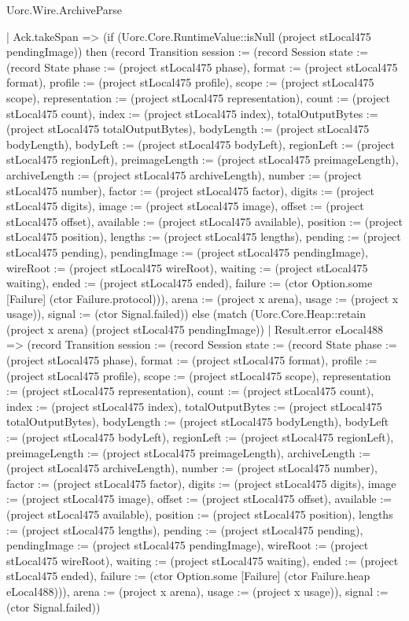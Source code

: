 \begin{lexlean}{Uorc.Wire.ArchiveParse}
\begin{semanticmodule}
{          | Ack.takeSpan => (if (Uorc.Core.RuntimeValue::isNull (project stLocal475 pendingImage)) then (record Transition {session := (record Session {state := (record State {phase := (project stLocal475 phase), format := (project stLocal475 format), profile := (project stLocal475 profile), scope := (project stLocal475 scope), representation := (project stLocal475 representation), count := (project stLocal475 count), index := (project stLocal475 index), totalOutputBytes := (project stLocal475 totalOutputBytes), bodyLength := (project stLocal475 bodyLength), bodyLeft := (project stLocal475 bodyLeft), regionLeft := (project stLocal475 regionLeft), preimageLength := (project stLocal475 preimageLength), archiveLength := (project stLocal475 archiveLength), number := (project stLocal475 number), factor := (project stLocal475 factor), digits := (project stLocal475 digits), image := (project stLocal475 image), offset := (project stLocal475 offset), available := (project stLocal475 available), position := (project stLocal475 position), lengths := (project stLocal475 lengths), pending := (project stLocal475 pending), pendingImage := (project stLocal475 pendingImage), wireRoot := (project stLocal475 wireRoot), waiting := (project stLocal475 waiting), ended := (project stLocal475 ended), failure := (ctor Option.some [Failure] (ctor Failure.protocol))}), arena := (project x arena), usage := (project x usage)}), signal := (ctor Signal.failed)}) else (match (Uorc.Core.Heap::retain (project x arena) (project stLocal475 pendingImage))
            | Result.error eLocal488 => (record Transition {session := (record Session {state := (record State {phase := (project stLocal475 phase), format := (project stLocal475 format), profile := (project stLocal475 profile), scope := (project stLocal475 scope), representation := (project stLocal475 representation), count := (project stLocal475 count), index := (project stLocal475 index), totalOutputBytes := (project stLocal475 totalOutputBytes), bodyLength := (project stLocal475 bodyLength), bodyLeft := (project stLocal475 bodyLeft), regionLeft := (project stLocal475 regionLeft), preimageLength := (project stLocal475 preimageLength), archiveLength := (project stLocal475 archiveLength), number := (project stLocal475 number), factor := (project stLocal475 factor), digits := (project stLocal475 digits), image := (project stLocal475 image), offset := (project stLocal475 offset), available := (project stLocal475 available), position := (project stLocal475 position), lengths := (project stLocal475 lengths), pending := (project stLocal475 pending), pendingImage := (project stLocal475 pendingImage), wireRoot := (project stLocal475 wireRoot), waiting := (project stLocal475 waiting), ended := (project stLocal475 ended), failure := (ctor Option.some [Failure] (ctor Failure.heap eLocal488))}), arena := (project x arena), usage := (project x usage)}), signal := (ctor Signal.failed)})
}
\end{semanticmodule}
\end{lexlean}
